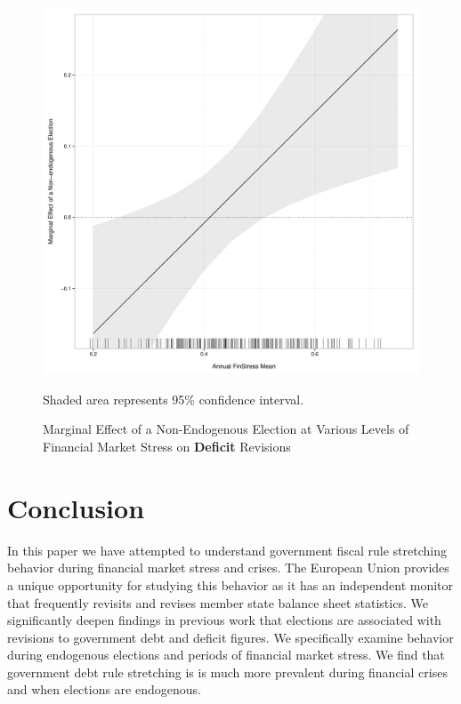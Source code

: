 \documentclass[]{article}
\begin{document}
\begin{figure}
    \caption{Marginal Effect of a Non-Endogenous Election at Various Levels of Financial Market Stress on \textbf{Deficit} Revisions}
    \label{me_finstress_non_endog_deficit}
    \begin{center}
        \includegraphics[scale=0.4]{figures/finstress_non_endog_deficit_me.pdf}
    \end{center}

	{\scriptsize{Shaded area represents 95\% confidence interval.}}

\end{figure}


\section{Conclusion}

In this paper we have attempted to understand government fiscal rule stretching behavior during financial market stress and crises. The European Union provides a unique opportunity for studying this behavior as it has an independent monitor that frequently revisits and revises member state balance sheet statistics. We significantly deepen findings in previous work that elections are associated with revisions to government debt and deficit figures. We specifically examine behavior during endogenous elections and periods of financial market stress. We find that government debt rule stretching is is much more prevalent during financial crises and when elections are endogenous.
\end{document}
